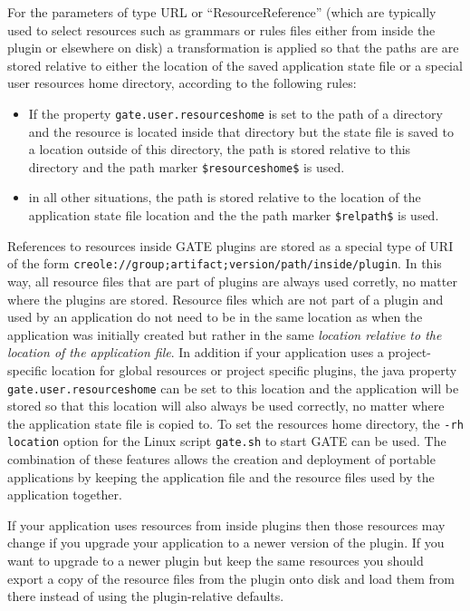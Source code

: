 For the parameters of type URL or ``ResourceReference'' (which are typically used to
select resources such as grammars or rules files either from inside the plugin
or elsewhere on disk) a transformation is applied so that  
the paths are are stored relative to either the location of the saved application 
state file or a special user resources home directory,
according to the following rules:
\begin{itemize}
\item If the property \texttt{gate.user.resourceshome} is set to the path of
  a directory and the resource
  is located inside that directory but the state file is saved to a location 
  outside of this directory, the path is stored relative to this directory
  and the path marker \verb=$resourceshome$= is used.
\item in all other situations, the path is stored relative to the location of
  the application state file location and the the path marker \verb=$relpath$=
  is used.
\end{itemize}

References to resources inside GATE plugins are stored as a special type of URI
of the form \texttt{creole://group;artifact;version/path/inside/plugin}.
In this way, all resource files that are part of plugins are always used corretly,
no matter where the plugins are stored. Resource files which are not part of a plugin
and used by an application do not need to be in the same location as when the 
application was initially created but rather in the same \emph{location relative 
to the location of the application file}. 
In addition if your application uses a project-specific location for global
resources or project specific plugins, the java property
\texttt{gate.user.resourceshome} can be set to this location and the
application will be stored so that this location will also always be used
correctly, no matter where the application state file is copied to. To set the
resources home directory, the \texttt{-rh location} option for the Linux script
\texttt{gate.sh} to start GATE can be used.  The combination of these features
allows the creation and deployment of portable applications by keeping the
application file and the resource files used by the application together.

If your application uses resources from inside plugins then those resources may
change if you upgrade your application to a newer version of the plugin.  If
you want to upgrade to a newer plugin but keep the same resources you should
export a copy of the resource files from the plugin onto disk and load them
from there instead of using the plugin-relative defaults.

